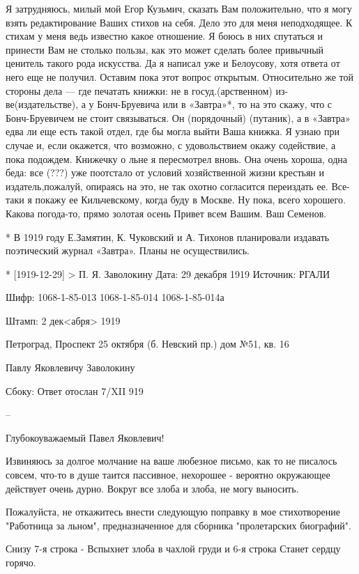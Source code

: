 \documentclass[]{memoir}
\begin{document}
Я затрудняюсь, милый мой Егор Кузьмич, сказать Вам положительно, что я могу взять редактирование Ваших стихов на себя. Дело это для меня неподходящее. К стихам у меня ведь известно какое отношение. Я боюсь в них спутаться и принести Вам не столько пользы, как это может сделать более привычный ценитель такого рода искусства. Да я написал уже и Белоусову, хотя ответа от него еще не получил.  Оставим пока этот вопрос открытым. Относительно же той стороны дела — где печатать книжки: не в госуд.(арственном) из-ве(издательстве), а у Бонч-Бруевича или в «Завтра»*, то на это скажу, что с Бонч-Бруевичем не стоит связываться. Он (порядочный) (путаник), а в «Завтра» едва ли еще есть такой отдел, где бы могла выйти Ваша книжка. Я узнаю при случае и, если окажется, что возможно, с удовольствием окажу содействие, а пока подождем. Книжечку о льне я пересмотрел вновь. Она очень хороша, одна беда: все (???) уже поотстало от условий хозяйственной жизни крестьян и издатель,пожалуй, опираясь на это, не так охотно согласится переиздать ее. Все-таки я покажу ее Кильчевскому, когда буду в Москве.
Ну пока, всего хорошего. Какова погода-то, прямо золотая осень
Привет всем Вашим.
Ваш Семенов.

   * В 1919 году Е.Замятин, К. Чуковский и А. Тихонов планировали издавать поэтический журнал «Завтра». Планы  не осуществились. 


* [1919-12-29] > П. Я. Заволокину 
Дата: 29 декабря 1919
Источник: РГАЛИ

Шифр:   1068-1-85-013
        1068-1-85-014
        1068-1-85-014а

Штамп: 2 дек<абря> 1919

Петроград, Проспект 25 октября (б. Невский пр.) дом №51, кв. 16

Павлу Яковлевичу Заволокину

Сбоку: Ответ отослан 7/XII 919

--

Глубокоуважаемый Павел Яковлевич!

Извиняюсь за долгое молчание на ваше любезное письмо, как то не писалось совсем, что-то в душе таится пассивное, нехорошее - вероятно окружающее действует очень дурно. Вокруг все злоба и злоба, не могу выносить.

Пожалуйста, не откажитесь внести следующую поправку в мое стихотворение "Работница за льном", предназначенное для сборника "пролетарских биографий".

Снизу 7-я строка -
Вспыхнет злоба в чахлой груди
и 6-я строка
Станет сердцу горячо.
\end{document}
